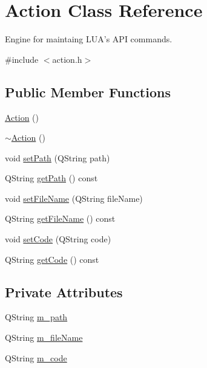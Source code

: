 \hypertarget{class_action}{\section{Action Class Reference}
\label{class_action}
}


Engine for maintaing L\-U\-A's A\-P\-I commands.  




{\ttfamily \#include $<$action.\-h$>$}

\subsection*{Public Member Functions}
\begin{DoxyCompactItemize}
\item 
\hyperlink{class_action_a4f457ccfc8336b565cadca56b36e0271}{Action} ()
\item 
\hyperlink{class_action_acdb06775d157339256a8ecd55749226c}{$\sim$\-Action} ()
\item 
void \hyperlink{class_action_a8d7527963d293e66cd9d63e4868f07a4}{set\-Path} (Q\-String path)
\item 
Q\-String \hyperlink{class_action_aae0058c4c9a79b296b1ef89670da4167}{get\-Path} () const 
\item 
void \hyperlink{class_action_a5d60106a1c5b9d492f32432e903ba0c4}{set\-File\-Name} (Q\-String file\-Name)
\item 
Q\-String \hyperlink{class_action_a6fe79539f83f2af7be05b698dae55d65}{get\-File\-Name} () const 
\item 
void \hyperlink{class_action_a534682646596250cd8bb98957e423791}{set\-Code} (Q\-String code)
\item 
Q\-String \hyperlink{class_action_a0cb6822da346dff4514e056547979cdd}{get\-Code} () const 
\end{DoxyCompactItemize}
\subsection*{Private Attributes}
\begin{DoxyCompactItemize}
\item 
Q\-String \hyperlink{class_action_acdaebb900bcc4fa101b7ad7fcc607e01}{m\-\_\-path}
\item 
Q\-String \hyperlink{class_action_a65a3f717f84c94c351ccff1e4f450816}{m\-\_\-file\-Name}
\item 
Q\-String \hyperlink{class_action_a15cb4f3d394cecf16438d01c05b87c98}{m\-\_\-code}
\end{DoxyCompactItemize}


